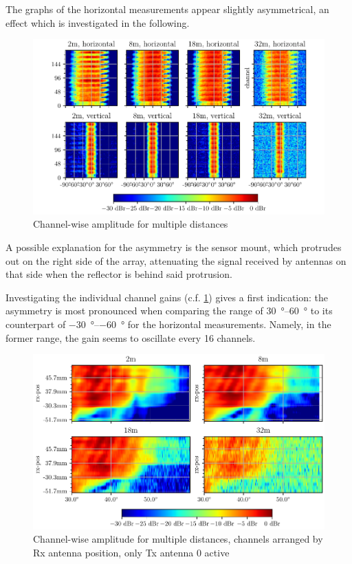 The graphs of the horizontal measurements appear slightly asymmetrical, an effect which is investigated in the following. \\

\begin{figure}
    \centering
    \includegraphics[width=\textwidth]{../figures/channel_amp.pdf}
    \caption{Channel-wise amplitude for multiple distances}
    \label{fig:chan_amp}
\end{figure}

A possible explanation for the asymmetry is the sensor mount,
which protrudes out on the right side of the array,
attenuating the signal received by antennas on that side when the reflector is behind said protrusion.

Investigating the individual channel gains (c.f. \ref{fig:chan_amp}) gives a first indication:
the asymmetry is most pronounced when comparing the range of \SIrange{30}{60}{\degree}
to its counterpart of \SIrange{-30}{-60}{\degree} for the horizontal measurements.
Namely, in the former range, the gain seems to oscillate every 16 channels.

\begin{figure}
    \centering
    \includegraphics[width=\textwidth]{../figures/channel_amp_tx0.pdf}
    \caption{Channel-wise amplitude for multiple distances, channels arranged by Rx antenna position, only Tx antenna 0 active}
    \label{fig:chan_amp_tx0}
\end{figure}

